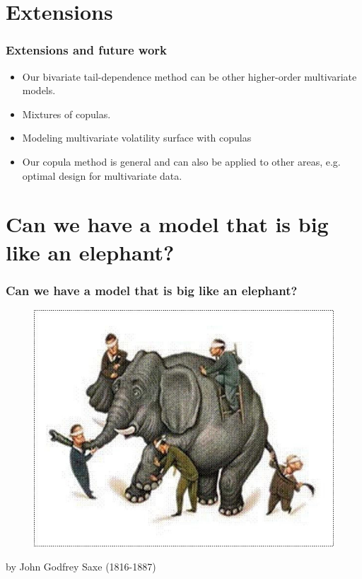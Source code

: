\documentclass{beamer}
\begin{document}
\section{Extensions}
\begin{frame}
  \frametitle{Extensions and future work}
  \begin{itemize}
  \item Our bivariate tail-dependence method can be other higher-order multivariate models.
  \item Mixtures of copulas.
  \item Modeling multivariate volatility surface with copulas
  \item Our copula method is general and can also be applied to other areas,
    e.g. optimal design for multivariate data.

  \end{itemize}
\end{frame}


\section{Can we have a model that is big like an elephant?}
\begin{frame}
  \frametitle{Can we have a model that is big like an elephant?}

      \begin{figure}
        \centering
        \includegraphics[height=0.8\textheight]{elephant}
      \end{figure}
\tiny{by John Godfrey Saxe (1816-1887)}
\end{frame}
\end{document}
